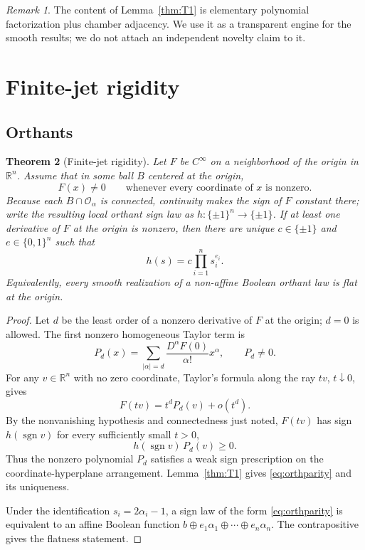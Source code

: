 \documentclass[11pt]{article}
\newtheorem{theorem}{Theorem}[section]
\theoremstyle{definition}
\theoremstyle{remark}
\newtheorem{remark}[theorem]{Remark}
\newcommand{\R}{\mathbb{R}}
\newcommand{\bits}{\{0,1\}}
\newcommand{\sign}{\operatorname{sgn}}
\begin{document}
\begin{remark}
The content of Lemma~\ref{thm:T1} is elementary polynomial factorization plus chamber adjacency. We use it as a transparent engine for the smooth results; we do not attach an independent novelty claim to it.
\end{remark}

\section{Finite-jet rigidity}\label{sec:finitejet}

\subsection{Orthants}

\begin{theorem}[Finite-jet rigidity]\label{thm:T2}
Let $F$ be $C^\infty$ on a neighborhood of the origin in $\R^n$. Assume that in some ball $B$ centered at the origin,
\[
 F(x)\ne0
 \qquad\text{whenever every coordinate of $x$ is nonzero.}
\]
Because each $B\cap\mathcal O_\alpha$ is connected, continuity makes the sign of $F$ constant there; write the resulting local orthant sign law as $h:\{\pm1\}^n\to\{\pm1\}$. If at least one derivative of $F$ at the origin is nonzero, then there are unique $c\in\{\pm1\}$ and $e\in\bits^n$ such that
\begin{equation}\label{eq:orthparity}
 h(s)=c\prod_{i=1}^n s_i^{e_i}.
\end{equation}
Equivalently, every smooth realization of a non-affine Boolean orthant law is flat at the origin.
\end{theorem}

\begin{proof}
Let $d$ be the least order of a nonzero derivative of $F$ at the origin; $d=0$ is allowed. The first nonzero homogeneous Taylor term is
\[
 P_d(x)=\sum_{|\alpha|=d}\frac{D^\alpha F(0)}{\alpha!}x^\alpha,
 \qquad P_d\ne0.
\]
For any $v\in\R^n$ with no zero coordinate, Taylor's formula along the ray $tv$, $t\downarrow0$, gives
\[
 F(tv)=t^dP_d(v)+o(t^d).
\]
By the nonvanishing hypothesis and connectedness just noted, $F(tv)$ has sign $h(\sign v)$ for every sufficiently small $t>0$,
\[
 h(\sign v)\,P_d(v)\ge0.
\]
Thus the nonzero polynomial $P_d$ satisfies a weak sign prescription on the coordinate-hyperplane arrangement. Lemma~\ref{thm:T1} gives \eqref{eq:orthparity} and its uniqueness.

Under the identification $s_i=2\alpha_i-1$, a sign law of the form \eqref{eq:orthparity} is equivalent to an affine Boolean function $b\oplus e_1\alpha_1\oplus\cdots\oplus e_n\alpha_n$. The contrapositive gives the flatness statement.
\end{proof}
\end{document}
